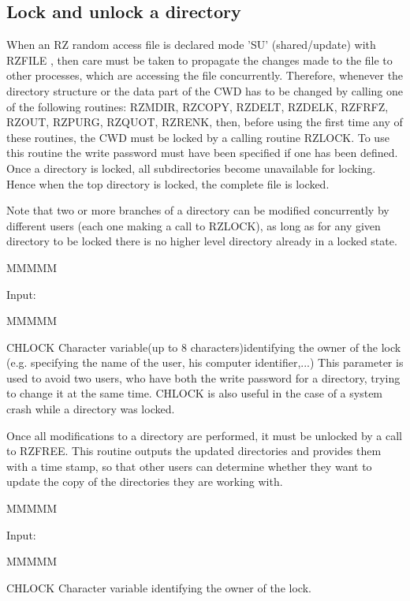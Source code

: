 \subsection{Lock and unlock a directory}
\par When an RZ random access file is declared mode 'SU' (shared/update)
with RZFILE , then care must be taken to propagate the changes made
to the file to other processes, which are accessing the file
concurrently. Therefore, whenever the
directory structure or the data part of the CWD has to be changed by
calling one of the following routines:
RZMDIR, RZCOPY, RZDELT, RZDELK, RZFRFZ, RZOUT, RZPURG, RZQUOT, RZRENK,
then, before using the first time any of these routines,
the CWD must be locked by a calling routine RZLOCK.
To use this routine the write
password must have been specified if one has been defined.
Once a directory is locked, all
subdirectories become unavailable for locking. Hence when the top
directory is locked, the complete file is locked.
\par Note that two or more branches of a directory can be modified
concurrently
by different users (each one making a call to RZLOCK), as long as
for any given directory to be locked there is no higher level
directory already in a locked state.
\begin{DL}{MMMMM}
\item[Input:
]
\begin{DL}{MMMMM}
\item[CHLOCK
]Character variable(up to 8 characters)identifying the owner
of the lock (e.g.
specifying the name of the user, his computer identifier,...)
This parameter is used to avoid two users, who have both the
write password for a directory, trying to change it at the same time.
CHLOCK is also useful in the case of a system crash while a directory
was locked.
\end{DL}
\end{DL}
\par Once all modifications to a directory are performed, it must
be unlocked by a call to RZFREE. This routine outputs the updated
directories and provides them with a time stamp, so that other users
can determine whether they want to update the copy of the directories
they are working with.
\begin{DL}{MMMMM}
\item[Input:
]
\begin{DL}{MMMMM}
\item[CHLOCK
]Character variable identifying the owner of the lock.
\end{DL}
\end{DL}
